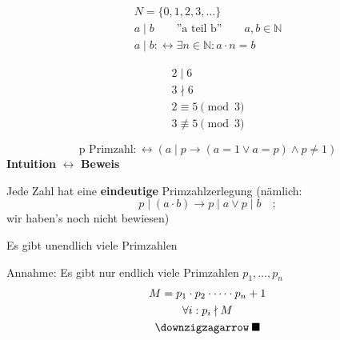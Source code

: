 \begin{bsp}[note = Zahlentheorie]
	\begin{gather*}
		N = \{ 0 , 1 , 2 , 3 , \ldots \} \\
 		a \mid b \qquad \text{''a teil b''} \qquad a , b \in \mathbb{N} \\
		a \mid b :\leftrightarrow \exists n \in \mathbb{N} : a \cdot n = b
	\end{gather*}

	\begin{bsp*}
		\begin{gather*}
			2 \mid 6 \\
			3 \nmid 6 \\
			2 \equiv 5 \pmod 3 \\
			3 \not\equiv 5 \pmod 3
		\end{gather*}
	\end{bsp*}
	\begin{equation*}
		\text{p Primzahl} :\leftrightarrow ( a \mid p \rightarrow ( a = 1 \vee a = p ) \wedge p \neq 1 )
	\end{equation*}
	\textbf{Intuition} $\leftrightarrow$ \textbf{Beweis}

	Jede Zahl hat eine \textbf{eindeutige} Primzahlzerlegung (nämlich: \[ p \mid (a \cdot b) \rightarrow p \mid a \vee p \mid b \quad ; \] wir haben's noch nicht bewiesen) \\
	\begin{satz*}
		Es gibt unendlich viele Primzahlen
		\begin{bew}[note = Euklid]
			Annahme: Es gibt nur endlich viele Primzahlen $p_1 , \ldots , p_n$
			\begin{gather*}
				M = p_1 \cdot p_2 \cdot \dotsm \cdot p_n + 1 \\
				\forall i : p_i \nmid M \\
				\text{\lightning} \: \blacksquare
			\end{gather*}
		\end{bew}
	\end{satz*}
\end{bsp}

